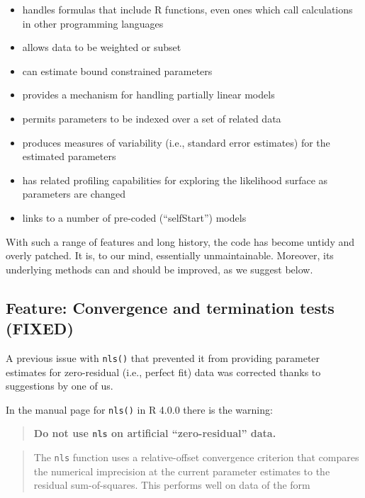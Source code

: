 \documentclass[
]{article}
\providecommand{\tightlist}{%
  \setlength{\itemsep}{0pt}\setlength{\parskip}{0pt}}
\begin{document}
\begin{itemize}
\tightlist
\item
  handles formulas that include R functions, even ones which call
  calculations in other programming languages
\item
  allows data to be weighted or subset
\item
  can estimate bound constrained parameters
\item
  provides a mechanism for handling partially linear models
\item
  permits parameters to be indexed over a set of related data
\item
  produces measures of variability (i.e., standard error estimates) for
  the estimated parameters
\item
  has related profiling capabilities for exploring the likelihood
  surface as parameters are changed
\item
  links to a number of pre-coded (``selfStart'') models
\end{itemize}

With such a range of features and long history, the code has become
untidy and overly patched. It is, to our mind, essentially
unmaintainable. Moreover, its underlying methods can and should be
improved, as we suggest below.

\hypertarget{feature-convergence-and-termination-tests-fixed}{%
\subsection{Feature: Convergence and termination tests
(FIXED)}\label{feature-convergence-and-termination-tests-fixed}}

A previous issue with \texttt{nls()} that prevented it from providing
parameter estimates for zero-residual (i.e., perfect fit) data was
corrected thanks to suggestions by one of us.

In the manual page for \texttt{nls()} in R 4.0.0 there is the warning:

\begin{quote}
\textbf{Do not use \texttt{nls} on artificial ``zero-residual'' data.}
\end{quote}

\begin{quote}
The \texttt{nls} function uses a relative-offset convergence criterion
that compares the numerical imprecision at the current parameter
estimates to the residual sum-of-squares. This performs well on data of
the form
\end{quote}
\end{document}
